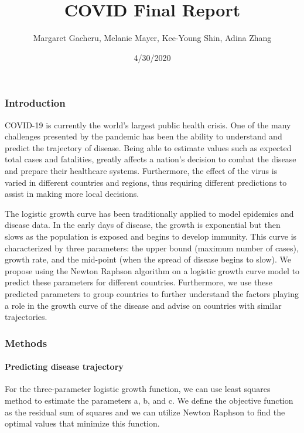 \documentclass[]{article}
\title{COVID Final Report}
\author{Margaret Gacheru, Melanie Mayer, Kee-Young Shin, Adina Zhang}
\date{4/30/2020}
\let\oldparagraph\paragraph
\renewcommand{\paragraph}[1]{\oldparagraph{#1}\mbox{}}
\begin{document}
\maketitle

\hypertarget{introduction}{%
\subsubsection{Introduction}\label{introduction}}

COVID-19 is currently the world's largest public health crisis. One of
the many challenges presented by the pandemic has been the ability to
understand and predict the trajectory of disease. Being able to estimate
values such as expected total cases and fatalities, greatly affects a
nation's decision to combat the disease and prepare their healthcare
systems. Furthermore, the effect of the virus is varied in different
countries and regions, thus requiring different predictions to assist in
making more local decisions.

The logistic growth curve has been traditionally applied to model
epidemics and disease data. In the early days of disease, the growth is
exponential but then slows as the population is exposed and begins to
develop immunity. This curve is characterized by three parameters: the
upper bound (maximum number of cases), growth rate, and the mid-point
(when the spread of disease begins to slow). We propose using the Newton
Raphson algorithm on a logistic growth curve model to predict these
parameters for different countries. Furthermore, we use these predicted
parameters to group countries to further understand the factors playing
a role in the growth curve of the disease and advise on countries with
similar trajectories.

\hypertarget{methods}{%
\subsubsection{Methods}\label{methods}}

\hypertarget{predicting-disease-trajectory}{%
\paragraph{Predicting disease
trajectory}\label{predicting-disease-trajectory}}

For the three-parameter logistic growth function, we can use least
squares method to estimate the parameters a, b, and c. We define the
objective function as the residual sum of squares and we can utilize
Newton Raphson to find the optimal values that minimize this function.
\end{document}
